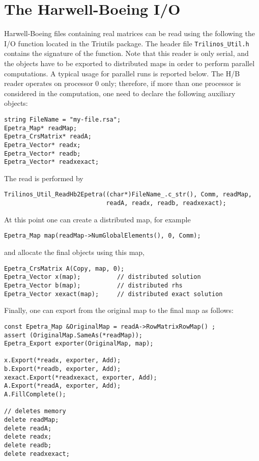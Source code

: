 \documentclass[11pt,relax]{SANDreport}
\begin{document}
\section{The Harwell-Boeing I/O}
\label{sec:hb}

Harwell-Boeing files containing real matrices can be read using the following
the I/O function located in the Triutils package. The header file
\verb!Trilinos_Util.h! contains the signature of the function. Note that this
reader is only serial, and the objects have to be exported to distributed maps
in order to perform parallel computations. A typical usage for parallel runs
is reported below. The H/B reader operates on processor 0 only; therefore, if
more than one processor is considered in the computation, one need to declare
the following auxiliary objects:
\begin{verbatim}
string FileName = "my-file.rsa";
Epetra_Map* readMap;
Epetra_CrsMatrix* readA;
Epetra_Vector* readx;
Epetra_Vector* readb;
Epetra_Vector* readxexact;
\end{verbatim}
The read is performed by
\begin{verbatim}
Trilinos_Util_ReadHb2Epetra((char*)FileName_.c_str(), Comm, readMap,
                            readA, readx, readb, readxexact);
\end{verbatim}
At this point one can create a distributed map, for example
\begin{verbatim}
Epetra_Map map(readMap->NumGlobalElements(), 0, Comm);
\end{verbatim}
and allocate the final objects using this map,
\begin{verbatim}
Epetra_CrsMatrix A(Copy, map, 0);
Epetra_Vector x(map);          // distributed solution
Epetra_Vector b(map);          // distributed rhs
Epetra_Vector xexact(map);     // distributed exact solution
\end{verbatim}
Finally, one can export from the original map to the final map as follows:
\begin{verbatim}
const Epetra_Map &OriginalMap = readA->RowMatrixRowMap() ;
assert (OriginalMap.SameAs(*readMap));
Epetra_Export exporter(OriginalMap, map);

x.Export(*readx, exporter, Add);
b.Export(*readb, exporter, Add);
xexact.Export(*readxexact, exporter, Add);
A.Export(*readA, exporter, Add);
A.FillComplete();

// deletes memory
delete readMap;
delete readA;
delete readx;
delete readb;
delete readxexact;
\end{verbatim}
\end{document}

